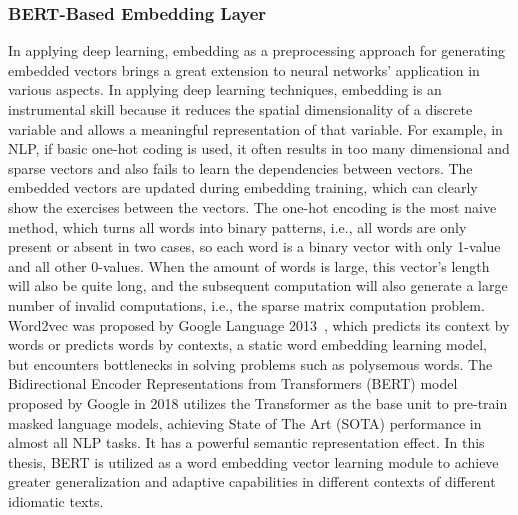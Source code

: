 \subsubsection{BERT-Based Embedding Layer}

In applying deep learning, embedding as a preprocessing approach for generating embedded vectors brings a great extension to neural networks' application in various aspects.  In applying deep learning techniques, embedding is an instrumental skill because it reduces the spatial dimensionality of a discrete variable and allows a meaningful representation of that variable. For example, in NLP, if basic one-hot coding is used, it often results in too many dimensional and sparse vectors and also fails to learn the dependencies between vectors. The embedded vectors are updated during embedding training, which can clearly show the exercises between the vectors. The one-hot encoding is the most naive method, which turns all words into binary patterns, i.e., all words are only present or absent in two cases, so each word is a binary vector with only 1-value and all other 0-values. When the amount of words is large, this vector's length will also be quite long, and the subsequent computation will also generate a large number of invalid computations, i.e., the sparse matrix computation problem. Word2vec was proposed by Google Language 2013~\cite{church2017word2vec}, which predicts its context by words or predicts words by contexts, a static word embedding learning model, but encounters bottlenecks in solving problems such as polysemous words. The Bidirectional Encoder Representations from Transformers (BERT) model proposed by Google in 2018 utilizes the Transformer as the base unit to pre-train masked language models, achieving State of The Art (SOTA) performance in almost all NLP tasks. It has a powerful semantic representation effect. In this thesis, BERT is utilized as a word embedding vector learning module to achieve greater generalization and adaptive capabilities in different contexts of different idiomatic texts.

